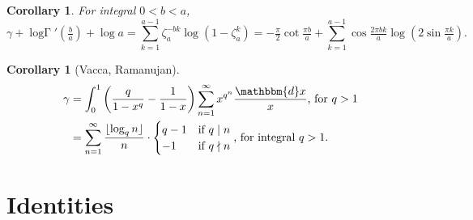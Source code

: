 \documentclass[12pt]{article}
\newcommand{\logG} {\operatorname {log \Gamma}}
\newcommand{\dd}[0] {\mathbbm{d}}
\numberwithin{equation}{section}
\newtheorem{corollary}[theorem]{Corollary}
\begin{document}
\begin{corollary}
For integral $0<b<a$,
\begin{equation*}
\gamma + \logG'(\tfrac{b}{a}) + \log a = \sum_{k=1}^{a-1} \zeta_a^{-b k} \log (1 - \zeta_a^k)= - \tfrac{\pi}{2} \cot \tfrac{\pi b}{a} + \sum_{k=1}^{a-1} \cos \tfrac{2 \pi b k}{a} \log (2 \sin \tfrac{\pi k}{a} )\text{.}
\end{equation*}
\end{corollary}

\begin{corollary}[Vacca, Ramanujan]
\begin{align*}
\gamma &= \int_{0}^{1} \left(\frac{q}{1-x^q} - \frac{1}{1-x}\right) \sum_{n=1}^{\infty}x^{q^n} \frac{\dd x}{x}\text{, for } q > 1\\
&= \sum_{n=1}^{\infty} \frac{\lfloor \log_q n\rfloor}{n} \cdot \begin{cases}
q-1 & \text{if }q \mid n\\
-1 & \text{if }q \nmid n
\end{cases}
\text{, for integral } q>1 \text{.}
\end{align*}
\end{corollary}

\section{Identities}
\end{document}
